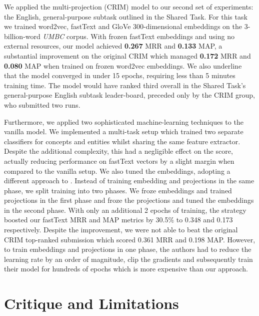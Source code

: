 We applied the multi-projection (CRIM) model to our second set of experiments: the English, general-purpose subtask outlined in the Shared Task.  For this task we trained word2vec, fastText and GloVe 300-dimensional embeddings on the 3-billion-word \textit{UMBC} corpus.  With frozen fastText embeddings and using no external resources, our model achieved \textbf{0.267} \ac{MRR} and \textbf{0.133} \ac{MAP}, a substantial improvement on the original CRIM which managed \textbf{0.172} \ac{MRR} and \textbf{0.080} \ac{MAP} when trained on frozen word2vec embeddings.  We also underline that the model converged in under 15 epochs, requiring less than 5 minutes training time.  The model would have ranked third overall in the Shared Task's general-purpose English subtask leader-board, preceded only by the \ac{CRIM} group, who submitted two runs.

Furthermore, we applied two sophisticated machine-learning techniques to the vanilla model.  We implemented a multi-task setup which trained two separate classifiers for concepts and entities whilst sharing the same feature extractor.  Despite the additional complexity, this had a negligible effect on the score, actually reducing performance on fastText vectors by a slight margin when compared to the vanilla setup.  We also tuned the embeddings, adopting a different approach to \citeauthor{bernier2018crim}.  Instead of training embedding and projections in the same phase, we split training into two phases.  We froze embeddings and trained projections in the first phase and froze the projections and tuned the embeddings in the second phase.  With only an additional 2 epochs of training, the strategy boosted our fastText \ac{MRR} and \ac{MAP} metrics by 30.5\% to 0.348 and 0.173 respectively.  Despite the improvement, we were not able to beat the original CRIM top-ranked submission which scored 0.361 \ac{MRR} and 0.198 \ac{MAP}.  However, to train embeddings and projections in one phase, the authors had to reduce the learning rate by an order of magnitude, clip the gradients and subsequently train their model for hundreds of epochs which is more expensive than our approach.



\section{Critique and Limitations}
 
